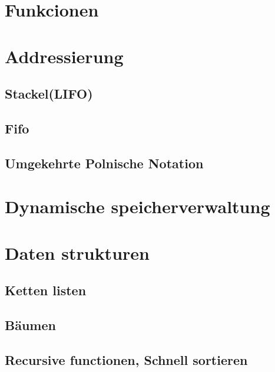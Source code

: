 \documentclass{article}[12pt]
\begin{document}
\section{Funkcionen}
\section{Addressierung}
\subsection{Stackel(LIFO)}
\subsection{Fifo}
\subsection{Umgekehrte Polnische Notation}
\section{Dynamische speicherverwaltung}
\section{Daten strukturen}
\subsection{Ketten listen}
\subsection{Bäumen}
\subsection{Recursive functionen, Schnell sortieren}
\end{document}
